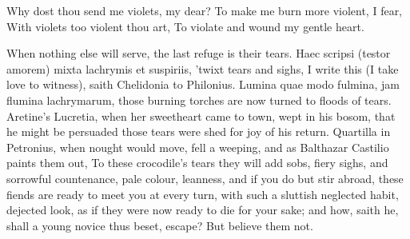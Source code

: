 {Why dost thou send me violets, my dear?
To make me burn more violent, I fear,
With violets too violent thou art,
To violate and wound my gentle heart.

When nothing else will serve, the last refuge is their tears. Haec
scripsi (testor amorem) mixta lachrymis et suspiriis, 'twixt tears and
sighs, I write this (I take love to witness), saith Chelidonia to
Philonius. Lumina quae modo fulmina, jam flumina lachrymarum, those
burning torches are now turned to floods of tears. Aretine's Lucretia,
when her sweetheart came to town, wept in his bosom, that he
might be persuaded those tears were shed for joy of his return.
Quartilla in Petronius, when nought would move, fell a weeping, and as
Balthazar Castilio paints them out, To these crocodile's tears
they will add sobs, fiery sighs, and sorrowful countenance, pale
colour, leanness, and if you do but stir abroad, these fiends are ready
to meet you at every turn, with such a sluttish neglected habit,
dejected look, as if they were now ready to die for your sake; and how,
saith he, shall a young novice thus beset, escape? But believe them
not.

}
